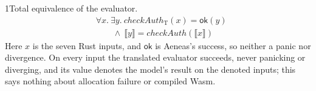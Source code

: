 \begin{perchstatement}{1}{Total equivalence of the evaluator.}\label{stmt:total-equivalence-of-the-evaluator}
\[\begin{aligned}&\forall x.\ \exists y.\ \mathit{checkAuth}_{\mathrm{T}}(x) = \mathsf{ok}(y)\\
&\qquad \land\ \llbracket y \rrbracket = \mathit{checkAuth}(\llbracket x \rrbracket)\end{aligned}\]
Here \(x\) is the seven Rust inputs, and \(\mathsf{ok}\) is Aeneas's success, so neither a panic nor divergence. On every input the translated evaluator succeeds, never panicking or diverging, and its value denotes the model's result on the denoted inputs; this says nothing about allocation failure or compiled Wasm.
\end{perchstatement}
